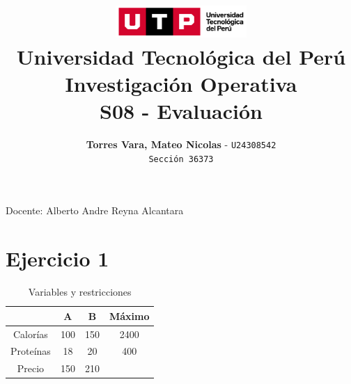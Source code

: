 \documentclass[12pt]{article}
\title{
  \vspace{2cm}
  \pagenumbering{gobble}
  \includegraphics[width=5cm]{../assets/logo-utp.png} \\
  \vspace{1cm}
  \textbf{Universidad Tecnológica del Perú} \\
  \vspace{2cm}
  \textbf{Investigación Operativa} \\
  \vspace{1cm}
  \large \textbf{S08 - Evaluación}
}
\author{
  \textbf{Torres Vara, Mateo Nicolas} - \texttt{U24308542} \\
  \texttt{Sección 36373}
}
\begin{document}
\maketitle
\begin{center}

  Docente: Alberto Andre Reyna Alcantara

\end{center}

%
%

\newpage
\section*{Ejercicio 1}
\begin{table}[h]
  \centering
  \begin{tabular}{|c|c|c|c|}
  \hline
            & A   & B   & Máximo \\ \hline
  Calorías  & 100 & 150 & 2400   \\ \hline
  Proteínas & 18  & 20  & 400    \\ \hline
  Precio    & 150 & 210 &        \\ \hline
  \end{tabular}
  \caption{Variables y restricciones}
  \label{tab:Ejercicio1}
\end{table}
\end{document}
